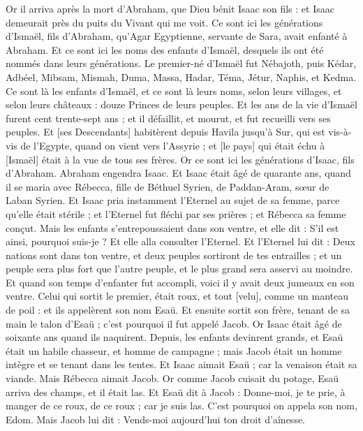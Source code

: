 \begin{multicols}{2}
Or il arriva après la mort d'Abraham, que Dieu bénit Isaac son fils : et Isaac demeurait près du puits du Vivant qui me voit.
Ce sont ici les générations d'Ismaël, fils d'Abraham, qu'Agar Egyptienne, servante de Sara, avait enfanté à Abraham.
Et ce sont ici les noms des enfants d'Ismaël, desquels ils ont été nommés dans leurs générations. Le premier-né d'Ismaël fut Nébajoth, puis Kédar, Adbéel, Mibsam,
Mismah, Duma, Massa,
Hadar, Téma, Jétur, Naphis, et Kedma.
Ce sont là les enfants d'Ismaël, et ce sont là leurs noms, selon leurs villages, et selon leurs châteaux : douze Princes de leurs peuples.
Et les ans de la vie d'Ismaël furent cent trente-sept ans ; et il défaillit, et mourut, et fut recueilli vers ses peuples.
Et [ses Descendants] habitèrent depuis Havila jusqu'à Sur, qui est vis-à-vis de l'Egypte, quand on vient vers l'Assyrie ; et [le pays] qui était échu à [Ismaël] était à la vue de tous ses frères.
Or ce sont ici les générations d'Isaac, fils d'Abraham. Abraham engendra Isaac.
Et Isaac était âgé de quarante ans, quand il se maria avec Rébecca, fille de Béthuel Syrien, de Paddan-Aram, sœur de Laban Syrien.
Et Isaac pria instamment l'Eternel au sujet de sa femme, parce qu'elle était stérile ; et l'Eternel fut fléchi par ses prières ; et Rébecca sa femme conçut.
Mais les enfants s'entrepoussaient dans son ventre, et elle dit : S'il est ainsi, pourquoi suis-je ? Et elle alla consulter l'Eternel.
Et l'Eternel lui dit : Deux nations sont dans ton ventre, et deux peuples sortiront de tes entrailles ; et un peuple sera plus fort que l'autre peuple, et le plus grand sera asservi au moindre.
Et quand son temps d'enfanter fut accompli, voici il y avait deux jumeaux en son ventre.
Celui qui sortit le premier, était roux, et tout [velu], comme un manteau de poil : et ils appelèrent son nom Esaü.
Et ensuite sortit son frère, tenant de sa main le talon d'Esaü ; c'est pourquoi il fut appelé Jacob. Or Isaac était âgé de soixante ans quand ils naquirent.
Depuis, les enfants devinrent grands, et Esaü était un habile chasseur, et homme de campagne ; mais Jacob était un homme intègre et se tenant dans les tentes.
Et Isaac aimait Esaü ; car la venaison était sa viande. Mais Rébecca aimait Jacob.
Or comme Jacob cuisait du potage, Esaü arriva des champs, et il était las.
Et Esaü dit à Jacob : Donne-moi, je te prie, à manger de ce roux, de ce roux ; car je suis las. C'est pourquoi on appela son nom, Edom.
Mais Jacob lui dit : Vends-moi aujourd'hui ton droit d'aînesse.

\end{multicols}
